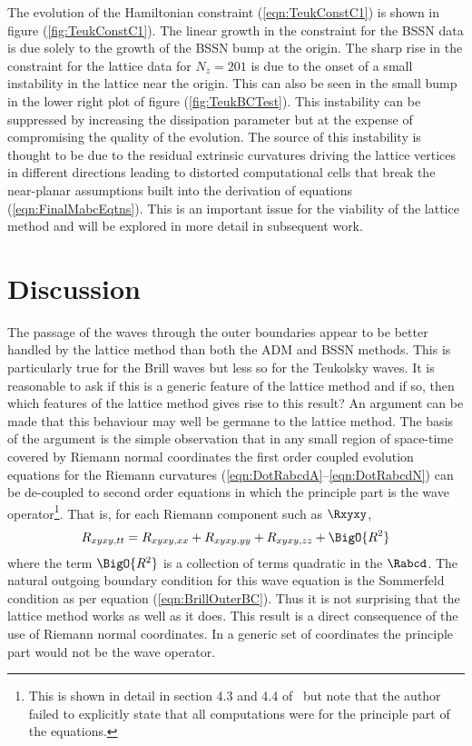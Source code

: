 \documentclass[a4paper,12pt]{article}
\numberwithin{equation}{section}
\begin{document}
The evolution of the Hamiltonian constraint (\ref{eqn:TeukConstC1}) is shown in figure
(\ref{fig:TeukConstC1}). The linear growth in the constraint for the BSSN data is due solely
to the growth of the BSSN bump at the origin. The sharp rise in the constraint for the
lattice data for $N_z=201$ is due to the onset of a small instability in the lattice near
the origin. This can also be seen in the small bump in the lower right plot of figure
(\ref{fig:TeukBCTest}). This instability can be suppressed by increasing the dissipation
parameter but at the expense of compromising the quality of the evolution. The source of
this instability is thought to be due to the residual extrinsic curvatures driving the
lattice vertices in different directions leading to distorted computational cells that break
the near-planar assumptions built into the derivation of equations
(\ref{eqn:FinalMabcEqtns}). This is an important issue for the viability of the lattice
method and will be explored in more detail in subsequent work.

\section{Discussion}
\label{sec:Discuss}

The passage of the waves through the outer boundaries appear to be better handled by the
lattice method than both the ADM and BSSN methods. This is particularly true for the Brill
waves but less so for the Teukolsky waves. It is reasonable to ask if this is a generic
feature of the lattice method and if so, then which features of the lattice method gives rise
to this result? An argument can be made that this behaviour may well be germane to the
lattice method. The basis of the argument is the simple observation that in any small region
of space-time covered by Riemann normal coordinates the first order coupled evolution
equations for the Riemann curvatures (\ref{eqn:DotRabcdA}--\ref{eqn:DotRabcdN}) can be
de-coupled to second order equations in which the principle part is the wave
operator\footnote{This is shown in detail in section 4.3 and 4.4 of~\cite{brewin:2010-03}
but note that the author failed to explicitly state that all computations were for the
principle part of the equations.}. That is, for each Riemann component such as $\Rxyxy$,
\begin{align}
   R_{xyxy,tt} = R_{xyxy,xx} + R_{xyxy,yy} + R_{xyxy,zz} + \BigO{R^2}
\end{align}
where the term $\BigO{R^2}$ is a collection of terms quadratic in the $\Rabcd$. The natural
outgoing boundary condition for this wave equation is the Sommerfeld condition as per
equation (\ref{eqn:BrillOuterBC}). Thus it is not surprising that the lattice method works as
well as it does. This result is a direct consequence of the use of Riemann normal
coordinates. In a generic set of coordinates the principle part would not be the wave
operator.
\end{document}
